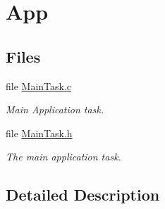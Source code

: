 \hypertarget{group___app}{\section{App}
\label{group___app}
}
\subsection*{Files}
\begin{DoxyCompactItemize}
\item 
file \hyperlink{_main_task_8c}{Main\+Task.\+c}
\begin{DoxyCompactList}\small\item\em Main Application task. \end{DoxyCompactList}\item 
file \hyperlink{_main_task_8h}{Main\+Task.\+h}
\begin{DoxyCompactList}\small\item\em The main application task. \end{DoxyCompactList}\end{DoxyCompactItemize}


\subsection{Detailed Description}
